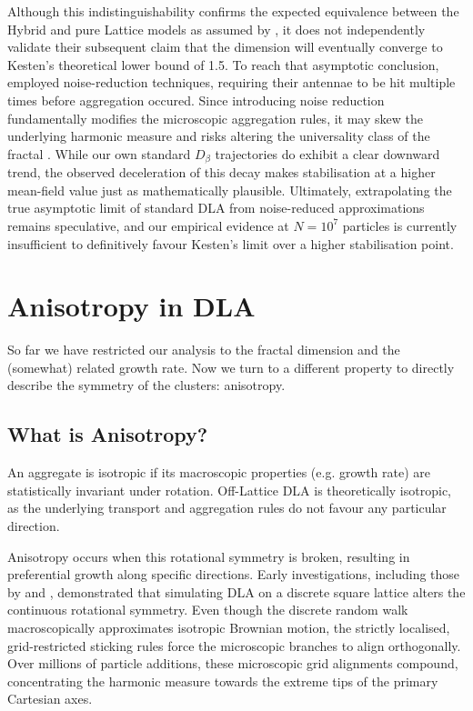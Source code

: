 \documentclass[12pt, a4paper, oneside]{report}
\theoremstyle{remark}
\begin{document}
Although this indistinguishability confirms the expected equivalence between the Hybrid and pure Lattice models as assumed by \citet{Menshutin2011}, it does not independently validate their subsequent claim that the dimension will eventually converge to Kesten's theoretical lower bound of 1.5. To reach that asymptotic conclusion, \citeauthor{Menshutin2011} employed noise-reduction techniques, requiring their antennae to be hit multiple times before aggregation occured. Since introducing noise reduction fundamentally modifies the microscopic aggregation rules, it may skew the underlying harmonic measure and risks altering the universality class of the fractal \cite{novotny1990}. While our own standard $D_\beta$ trajectories do exhibit a clear downward trend, the observed deceleration of this decay makes stabilisation at a higher mean-field value just as mathematically plausible. Ultimately, extrapolating the true asymptotic limit of standard DLA from noise-reduced approximations remains speculative, and our empirical evidence at $N=10^7$ particles is currently insufficient to definitively favour Kesten's limit over a higher stabilisation point.

\chapter{Anisotropy in DLA}
\label{ch:anisotropy}
So far we have restricted our analysis to the fractal dimension and the (somewhat) related growth rate. Now we turn to a different property to directly describe the symmetry of the clusters: anisotropy.
\section{What is Anisotropy?}
\label{sec:anisotropy_overview}
An aggregate is isotropic if its macroscopic properties (e.g. growth rate) are statistically invariant under rotation. Off-Lattice DLA is theoretically isotropic, as the underlying transport and aggregation rules do not favour any particular direction. 

Anisotropy occurs when this rotational symmetry is broken, resulting in preferential growth along specific directions. Early investigations, including those by \citet{meakin1986} and \citet{Ball1985}, demonstrated that simulating DLA on a discrete square lattice alters the continuous rotational symmetry. Even though the discrete random walk macroscopically approximates isotropic Brownian motion, the strictly localised, grid-restricted sticking rules force the microscopic branches to align orthogonally. Over millions of particle additions, these microscopic grid alignments compound, concentrating the harmonic measure towards the extreme tips of the primary Cartesian axes.
\end{document}
